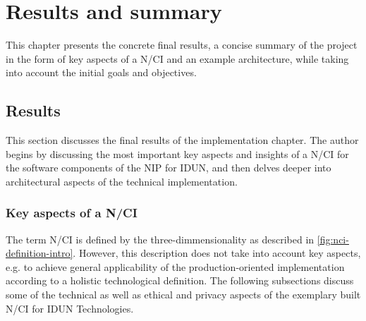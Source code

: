 \chapter{Results and summary}
\graphicspath{{Chapter5/Figs/}{Chapter5/Figs/}}

This chapter presents the concrete final results, a concise summary of the project in the form of key aspects of a N/CI and an example architecture, while taking into account the initial goals and objectives.


\section{Results}
\label{chapter5-results}

This section discusses the final results of the implementation chapter. The author begins by discussing the most important key aspects and insights of a N/CI for the software components of the NIP for IDUN, and then delves deeper into architectural aspects of the technical implementation.

\subsection{Key aspects of a N/CI}
\label{chapter5-key-aspects}

The term N/CI is defined by the three-dimmensionality as described in \autoref{fig:nci-definition-intro}. However, this description does not take into account key aspects, e.g. to achieve general applicability of the production-oriented implementation according to a holistic technological definition. The following subsections discuss some of the technical as well as ethical and privacy aspects of the exemplary built N/CI for IDUN Technologies.

